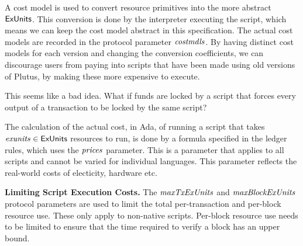 A cost model is used to convert resource primitives into the
more abstract $\mathsf{ExUnits}$. This conversion is done by the interpreter executing the script,
which means we can keep the cost model abstract in this specification.
The actual cost models are recorded in the protocol parameter $\mathit{costmdls}$.
%
By having distinct cost models for each version and changing the conversion coefficients, we can discourage users from
paying into scripts that have been made using old versions of Plutus, by making these more expensive to execute.
\begin{note}
  This seems like a bad idea. What if funds are locked by a script that forces every output of a transaction to be locked by the same script?
\end{note}
%
The calculation of the actual cost, in Ada, of running
a script that takes $\mathit{exunits} \in \mathsf{ExUnits}$ resources to run,
is done by a formula specified in the ledger rules, which uses the
$\mathit{prices}$ parameter. This is a parameter that applies to all
scripts and cannot be varied for individual languages. This parameter
reflects the real-world costs of electicity, hardware etc.

\textbf{Limiting Script Execution Costs.}
The $\mathit{maxTxExUnits}$ and $\mathit{maxBlockExUnits}$ protocol parameters are
used to limit the total per-transaction and per-block resource use. These only apply to non-native scripts.
Per-block resource use needs to be limited to ensure that the time required to verify a block has an upper bound.

